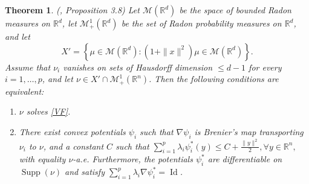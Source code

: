 \documentclass{article}
\DeclareMathOperator*{\Supp}{Supp}
\DeclareMathOperator*{\Id}{Id}
\newtheorem{theorem}{Theorem}
\newcommand{\R}{\mathbb{R}}
\begin{document}
\begin{theorem}(\cite{aguehBarycentersWassersteinSpace2010}, Proposition 3.8)
  \label{ACTheorem}
  Let \(\mathcal{M}(\R^d)\) be the space of bounded Radon measures on \(\R^d\), let \(\mathcal{M}_{+}^1(\R^d)\) be the set of Radon probability measures on \(\R^d\), and let \[X' = \left\{ \mu\in \mathcal{M}(\R^d) : (1 + \|x\|^2)\mu \in \mathcal{M}(\R^d) \right\}.\] Assume that \(\nu_i\) vanishes on sets of Hausdorff dimension \(\le d-1\) for every \(i=1,\dots,p\), and let \(\nu \in X' \cap \mathcal{M}_+^1(\R^n)\). Then the following conditions are equivalent:
  \begin{enumerate}
    \item \(\nu\) solves \eqref{VF}.
    \item There exist convex potentials \(\psi_i\) such that \(\nabla\psi_i\) is Brenier's map transporting \(\nu_i\) to \(\nu\), and a constant \(C\) such that \(\sum\limits_{i=1}^p\lambda_i\psi_i^*(y)\le C + \frac{\|y\|^2}{2}, \forall y \in \R^n,\) with equality \(\nu\)-a.e. Furthermore, the potentials \(\psi_i^*\) are differentiable on \(\Supp(\nu)\) and satisfy \(\sum\limits_{i=1}^p\lambda_i\nabla\psi_i^* = \Id\).
  \end{enumerate}

\end{theorem}
\end{document}
